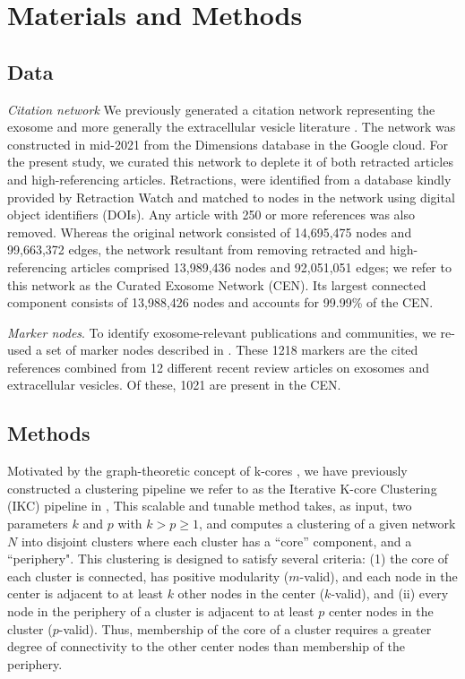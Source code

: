 \documentclass[12pt, oneside]{article}   	%
\begin{document}
\section{Materials and Methods}

\subsection{Data} 

\emph{Citation network} We previously generated a citation network \citep{Wedell2022} representing the exosome \citep{harding1983} and more generally the extracellular vesicle literature \citep{raposo2021}. The network was constructed in mid-2021 from the Dimensions database \citep{hook2018dimensions} in the Google cloud. For the present study, we curated this network to deplete it of both retracted articles and high-referencing articles. Retractions, were identified from a database kindly provided by Retraction Watch and matched to nodes in the network using digital object identifiers (DOIs). Any article with 250 or more references was also removed. Whereas the original network consisted of 14,695,475 nodes and 99,663,372 edges, the network resultant from removing retracted and high-referencing articles comprised 13,989,436 nodes and 92,051,051 edges; we refer to this network as   the Curated Exosome Network (CEN). Its largest connected component consists of 13,988,426 nodes and accounts for 99.99\% of the CEN.

\emph{Marker nodes}. To identify exosome-relevant publications and communities, we re-used a set of marker nodes described in  \citep{Wedell2022}. These 1218 markers are the cited references combined from 12 different recent review articles on exosomes and extracellular vesicles. Of these, 1021 are present in the CEN. 

\subsection{Methods} Motivated by the graph-theoretic concept of k-cores \citep{Giatsidis2011,malliaros2019}, we have previously constructed a clustering pipeline we refer to as  the Iterative K-core Clustering (IKC) pipeline in \cite{Wedell2022}, This scalable and tunable method takes, as input, two parameters $k$ and $p$ with $k > p \geq 1$, and computes a clustering of a given network $N$ into disjoint clusters where each cluster has a ``core'' component, and a ``periphery". This clustering is designed to satisfy several criteria: (1) the core of each cluster is connected,  has positive modularity ($m$-valid), and each node in the center  is adjacent to at least $k$ other nodes in the center ($k$-valid), and (ii) every node in the periphery of a cluster is adjacent to at least $p$ center nodes in the cluster ($p$-valid). Thus, membership of the core of a cluster requires a greater degree of connectivity to the other center nodes than membership of the periphery. 
\end{document}
